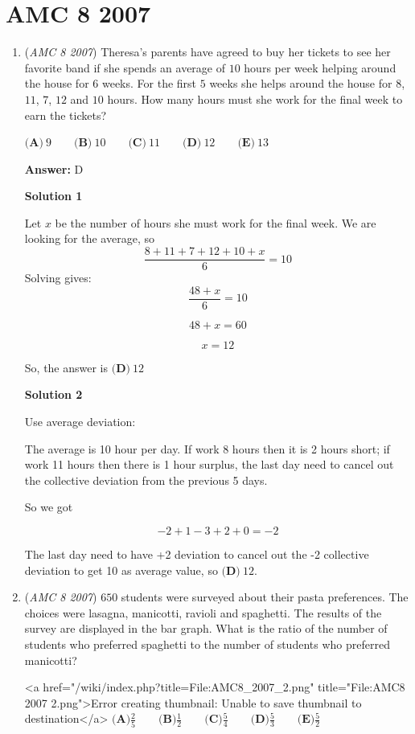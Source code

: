 \section{AMC 8 2007}
        \begin{enumerate}
        	\item (\textit{AMC 8 2007}) Theresa's parents have agreed to buy her tickets to see her favorite band if she spends an average of $10$ hours per week helping around the house for $6$ weeks. For the first $5$ weeks she helps around the house for $8$, $11$, $7$, $12$ and $10$ hours. How many hours must she work for the final week to earn the tickets?


 $\textbf{(A)}\ 9 \qquad\textbf{(B)}\ 10 \qquad\textbf{(C)}\ 11 \qquad\textbf{(D)}\ 12 \qquad\textbf{(E)}\ 13$

 \textbf{Answer: }D



\textbf{Solution 1}

Let $x$ be the number of hours she must work for the final week. We are looking for the average, so  
 \[\frac{8 + 11 + 7 + 12 + 10 + x}{6} = 10\]  Solving gives:
 \[\frac{48 + x}{6} = 10\]

 \[48 + x = 60\]

 \[x = 12\]

 So, the answer is $\boxed{\textbf{(D)}\ 12}$




\textbf{Solution 2}

Use average deviation:

 The average is 10 hour per day. If work 8 hours then it is 2 hours short; if work 11 hours then there is 1 hour surplus, the last day need to cancel out the collective deviation from the previous 5 days.

 So we got 

 
 \[-2+1-3+2+0=-2\]

 The last day need to have +2 deviation to cancel out the -2 collective deviation to get 10 as average value, so $\boxed{\textbf{(D)}\ 12}$.

 


	\item (\textit{AMC 8 2007}) $650$ students were surveyed about their pasta preferences. The choices were lasagna, manicotti, ravioli and spaghetti. The results of the survey are displayed in the bar graph. What is the ratio of the number of students who preferred spaghetti to the number of students who preferred manicotti?


 <a href="/wiki/index.php?title=File:AMC8\_2007\_2.png" title="File:AMC8 2007 2.png">Error creating thumbnail: Unable to save thumbnail to destination</a>
$\textbf{(A)} \frac{2}{5} \qquad \textbf{(B)} \frac{1}{2} \qquad \textbf{(C)} \frac{5}{4} \qquad \textbf{(D)} \frac{5}{3} \qquad \textbf{(E)} \frac{5}{2}$


\end{enumerate}
